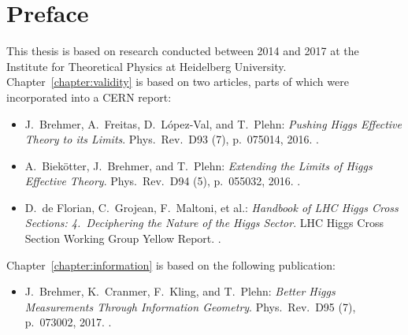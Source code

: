 
\chapter*{Preface}
\label{chapter:preface}

This thesis is based on research conducted between 2014 and 2017 at
the Institute for Theoretical Physics at Heidelberg
University. Chapter~\ref{chapter:validity} is based on two articles,
parts of which were incorporated into a CERN report:
% 
\begin{itemize}
  \item[\cite{Brehmer:2015rna}] J.~Brehmer, A.~Freitas, D.~L\'opez-Val, and T.~Plehn:\newline
	\emph{Pushing Higgs Effective Theory to its Limits}.\newline
	Phys.~Rev.~D93 (7), p.~075014, 2016. .
  \item[\cite{Biekotter:2016ecg}] A.~Biek\"otter, J.~Brehmer, and T.~Plehn:\newline
	\emph{Extending the Limits of Higgs Effective Theory}.\newline
	Phys.~Rev.~D94 (5), p.~055032, 2016. . 
  \item[\cite{deFlorian:2016spz}] D.~de Florian, C.~Grojean, F.~Maltoni, et al.:\newline
        \emph{Handbook of LHC Higgs Cross Sections: 4.~Deciphering the Nature of the Higgs Sector}.\newline
        LHC Higgs Cross Section Working Group Yellow Report. .
\end{itemize}
%
Chapter~\ref{chapter:information} is based on the following publication:
%
\begin{itemize}
  \item[\cite{Brehmer:2016nyr}] J.~Brehmer, K.~Cranmer, F.~Kling, and T.~Plehn:\newline
	\emph{Better Higgs Measurements Through Information Geometry}.\newline
       Phys.~Rev.~D95 (7), p.~073002, 2017. .
\end{itemize}
%
